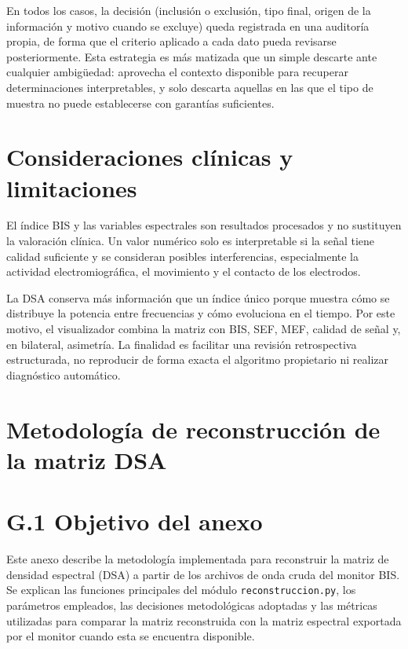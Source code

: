 \documentclass[
  spanish,
  a4paper,
  12pt,
  twoside]{memoir}
\newcommand{\apendice}[1]{\chapter{#1}}
\begin{document}
En todos los casos, la decisión (inclusión o exclusión, tipo final,
origen de la información y motivo cuando se excluye) queda registrada en
una auditoría propia, de forma que el criterio aplicado a cada dato
pueda revisarse posteriormente. Esta estrategia es más matizada que un
simple descarte ante cualquier ambigüedad: aprovecha el contexto
disponible para recuperar determinaciones interpretables, y solo
descarta aquellas en las que el tipo de muestra no puede establecerse
con garantías suficientes.

\chapter{Consideraciones clínicas y
limitaciones}\label{consideraciones-cluxednicas-y-limitaciones}

El índice BIS y las variables espectrales son resultados procesados y no
sustituyen la valoración clínica. Un valor numérico solo es
interpretable si la señal tiene calidad suficiente y se consideran
posibles interferencias, especialmente la actividad electromiográfica,
el movimiento y el contacto de los electrodos.

La DSA conserva más información que un índice único porque muestra cómo
se distribuye la potencia entre frecuencias y cómo evoluciona en el
tiempo. Por este motivo, el visualizador combina la matriz con BIS, SEF,
MEF, calidad de señal y, en bilateral, asimetría. La finalidad es
facilitar una revisión retrospectiva estructurada, no reproducir de
forma exacta el algoritmo propietario ni realizar diagnóstico
automático.

\apendice{Metodología de reconstrucción de la matriz DSA}
\label{ap:estudio-experimental}

\chapter{G.1 Objetivo del anexo}\label{g.1-objetivo-del-anexo}

Este anexo describe la metodología implementada para reconstruir la
matriz de densidad espectral (DSA) a partir de los archivos de onda
cruda del monitor BIS. Se explican las funciones principales del módulo
\texttt{reconstruccion.py}, los parámetros empleados, las decisiones
metodológicas adoptadas y las métricas utilizadas para comparar la
matriz reconstruida con la matriz espectral exportada por el monitor
cuando esta se encuentra disponible.
\end{document}
